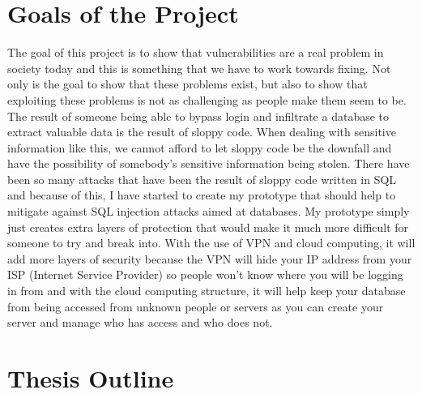\section{Goals of the Project}
\label{sec:goals}

The goal of this project is to show that vulnerabilities are a real problem in society today and this is something that we have to work towards fixing. Not only is the goal to show that these problems exist, but also to show that exploiting these problems is not as challenging as people make them seem to be. The result of someone being able to bypass login and infiltrate a database to extract valuable data is the result of sloppy code. When dealing with sensitive information like this, we cannot afford to let sloppy code be the downfall and have the possibility of somebody's sensitive information being stolen. There have been so many attacks that have been the result of sloppy code written in SQL and because of this, I have started to create my prototype that should help to mitigate against SQL injection attacks aimed at databases. My prototype simply just creates extra layers of protection that would make it much more difficult for someone to try and break into. With the use of VPN and cloud computing, it will add more layers of security because the VPN will hide your IP address from your ISP (Internet Service Provider) so people won't know where you will be logging in from and with the cloud computing structure, it will help keep your database from being accessed from unknown people or servers as you can create your server and manage who has access and who does not.


\section{Thesis Outline}
\label{sec:outline}

